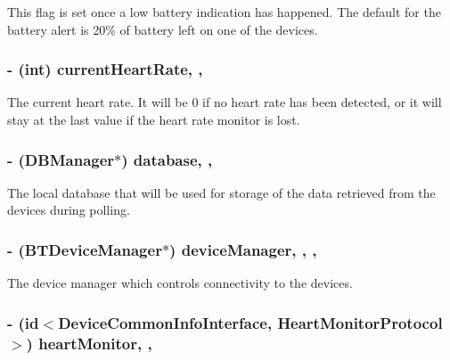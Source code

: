 This flag is set once a low battery indication has happened. The default for the battery alert is 20\% of battery left on one of the devices. \hypertarget{interface_device_poll_manager_a302b6434aa606031f78f721c9e40f0cf}{
\subsubsection[{current\-Heart\-Rate}]{\setlength{\rightskip}{0pt plus 5cm}-\/ (int) current\-Heart\-Rate\hspace{0.3cm}{\ttfamily [read]}, {\ttfamily [write]}, {\ttfamily [atomic]}}}\label{interface_device_poll_manager_a302b6434aa606031f78f721c9e40f0cf}
The current heart rate. It will be 0 if no heart rate has been detected, or it will stay at the last value if the heart rate monitor is lost. \hypertarget{interface_device_poll_manager_a66a02f95a478a42c7e45986317e3c6c1}{
\subsubsection[{database}]{\setlength{\rightskip}{0pt plus 5cm}-\/ ({\bf D\-B\-Manager}$\ast$) database\hspace{0.3cm}{\ttfamily [read]}, {\ttfamily [write]}, {\ttfamily [atomic]}}}\label{interface_device_poll_manager_a66a02f95a478a42c7e45986317e3c6c1}
The local database that will be used for storage of the data retrieved from the devices during polling. \hypertarget{interface_device_poll_manager_a813e014763804b71e247ca335fe91761}{
\subsubsection[{device\-Manager}]{\setlength{\rightskip}{0pt plus 5cm}-\/ ({\bf B\-T\-Device\-Manager}$\ast$) device\-Manager\hspace{0.3cm}{\ttfamily [read]}, {\ttfamily [write]}, {\ttfamily [atomic]}, {\ttfamily [retain]}}}\label{interface_device_poll_manager_a813e014763804b71e247ca335fe91761}
The device manager which controls connectivity to the devices. \hypertarget{interface_device_poll_manager_a5d06bcab588b72afdf5fce4c102afe91}{
\subsubsection[{heart\-Monitor}]{\setlength{\rightskip}{0pt plus 5cm}-\/ (id$<${\bf Device\-Common\-Info\-Interface}, {\bf Heart\-Monitor\-Protocol}$>$) heart\-Monitor\hspace{0.3cm}{\ttfamily [read]}, {\ttfamily [write]}, {\ttfamily [atomic]}}}\label{interface_device_poll_manager_a5d06bcab588b72afdf5fce4c102afe91}
